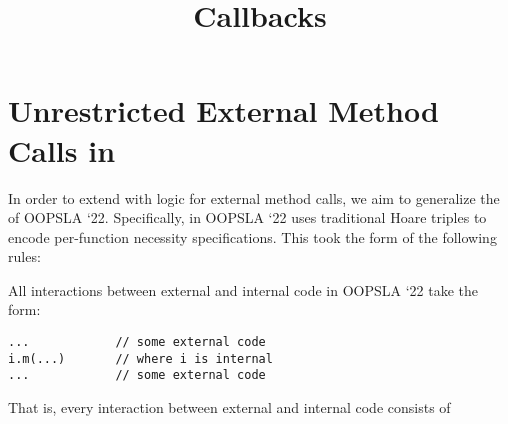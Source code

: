\documentclass[11pt]{article} %
\title{Callbacks}
\date{} %
\theoremstyle{definition}
\begin{document}
\maketitle

\section{Unrestricted External Method Calls in \Nec}

In order to extend \Nec with logic for external method calls, we aim to generalize 
the \Nec of OOPSLA `22. Specifically, \Nec in OOPSLA `22 uses traditional Hoare triples to encode 
per-function necessity specifications. This took the form of the following rules:
All interactions between external and internal code in OOPSLA `22 take the form:
\begin{lstlisting}[language = Chainmail, mathescape=true, frame=lines]
...            // some external code
i.m(...)       // where i is internal
...            // some external code
\end{lstlisting}
That is, every interaction between external and internal code consists of 
\end{document}
